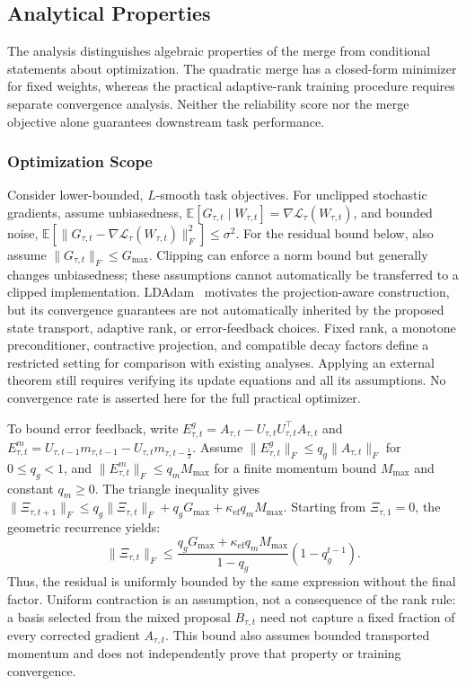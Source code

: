 \documentclass[fleqn,10pt]{wlscirep}
\begin{document}
\subsection{Analytical Properties}
\label{subsec:theoretical_analysis}

The analysis distinguishes algebraic properties of the merge from conditional statements about optimization. The quadratic merge has a closed-form minimizer for fixed weights, whereas the practical adaptive-rank training procedure requires separate convergence analysis. Neither the reliability score nor the merge objective alone guarantees downstream task performance.

\subsubsection{Optimization Scope}
\label{subsubsec:training_convergence}
\label{subsubsec:error_feedback_analysis}
\label{subsubsec:task_vector_approximation}

Consider lower-bounded, $L$-smooth task objectives. For unclipped stochastic gradients, assume unbiasedness, $\mathbb{E}[G_{\tau,t}\mid W_{\tau,t}]= \nabla\mathcal{L}_{\tau}(W_{\tau,t})$, and bounded noise, $\mathbb{E}[\|G_{\tau,t}-\nabla\mathcal{L}_{\tau}(W_{\tau,t})\|_F^2] \leq\sigma^2$. For the residual bound below, also assume $\|G_{\tau,t}\|_F\leq G_{\max}$. Clipping can enforce a norm bound but generally changes unbiasedness; these assumptions cannot automatically be transferred to a clipped implementation. LDAdam~\cite{ldadam2025} motivates the projection-aware construction, but its convergence guarantees are not automatically inherited by the proposed state transport, adaptive rank, or error-feedback choices. Fixed rank, a monotone preconditioner, contractive projection, and compatible decay factors define a restricted setting for comparison with existing analyses. Applying an external theorem still requires verifying its update equations and all its assumptions. No convergence rate is asserted here for the full practical optimizer.

To bound error feedback, write $E_{\tau,t}^{g}=A_{\tau,t}-U_{\tau,t}U_{\tau,t}^{\top}A_{\tau,t}$ and $E_{\tau,t}^{m}=U_{\tau,t-1}m_{\tau,t-1} -U_{\tau,t}m_{\tau,t-\frac12}$. Assume $\|E_{\tau,t}^{g}\|_F\leq q_g\|A_{\tau,t}\|_F$ for $0\leq q_g<1$, and $\|E_{\tau,t}^{m}\|_F\leq q_mM_{\max}$ for a finite momentum bound $M_{\max}$ and constant $q_m\geq0$. The triangle inequality gives $\|\Xi_{\tau,t+1}\|_F\leq q_g\|\Xi_{\tau,t}\|_F +q_gG_{\max}+\kappa_{\mathrm{ef}}q_mM_{\max}$. Starting from $\Xi_{\tau,1}=0$, the geometric recurrence yields:
\begin{equation}
\|\Xi_{\tau,t}\|_F
\leq\frac{q_gG_{\max}+\kappa_{\mathrm{ef}}q_mM_{\max}}{1-q_g}
(1-q_g^{t-1}).
\label{eq:error_bound}
\end{equation}
Thus, the residual is uniformly bounded by the same expression without the final factor. Uniform contraction is an assumption, not a consequence of the rank rule: a basis selected from the mixed proposal $B_{\tau,t}$ need not capture a fixed fraction of every corrected gradient $A_{\tau,t}$. This bound also assumes bounded transported momentum and does not independently prove that property or training convergence.
\end{document}
